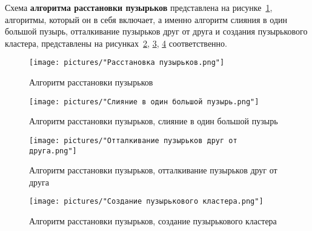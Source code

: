 Схема \textbf{алгоритма расстановки пузырьков} представлена на рисунке~\ref{fig:bubble_positioning}, алгоритмы, который он в себя включает, а именно алгоритм слияния в один большой пузырь, отталкивание пузырьков друг от друга и создания пузырькового кластера, представлены на рисунках~\ref{fig:merge_bubbles}, \ref{fig:push_bubbles_apart}, \ref{fig:create_bubble_cluster} соответственно.

\begin{figure}[h]
	\centering
	\texttt{[image: pictures/"Расстановка пузырьков.png"]}
	\caption{Алгоритм расстановки пузырьков}
	\label{fig:bubble_positioning}
\end{figure}
\begin{figure}[h]
	\centering
	\texttt{[image: pictures/"Слияние в один большой пузырь.png"]}
	\caption{Алгоритм расстановки пузырьков, слияние в один большой пузырь}
	\label{fig:merge_bubbles}
\end{figure}
\begin{figure}[h]
	\centering
	\texttt{[image: pictures/"Отталкивание пузырьков друг от друга.png"]}
	\caption{Алгоритм расстановки пузырьков, отталкивание пузырьков друг от друга}
	\label{fig:push_bubbles_apart}
\end{figure}
\begin{figure}[h]
	\centering
	\texttt{[image: pictures/"Создание пузырькового кластера.png"]}
	\caption{Алгоритм расстановки пузырьков, создание пузырькового кластера}
	\label{fig:create_bubble_cluster}
\end{figure}

